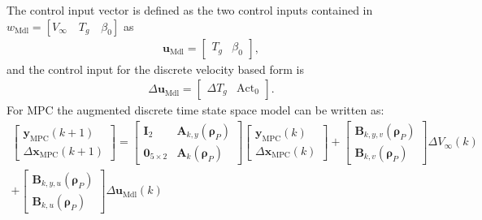 The control input vector is defined as the two control inputs contained in $w_{\text{Mdl}} = [V_{\infty} \quad T_g \quad \beta_0]$ as
\begin{align*}
    \bm{u}_{\text{Mdl}} = \begin{bmatrix} T_g & \beta_0 \end{bmatrix},
\end{align*} 
and the control input for the discrete velocity based form is %
\begin{align} \label{eq:DeltaUinput}
    \Delta \bm{u}_{\text{Mdl}} = \begin{bmatrix} \Delta T_g & \text{Act}_0  \end{bmatrix}. 
\end{align} 
%
For MPC the augmented discrete time state space model can be written as:
\begin{align*}
    \begin{bmatrix}
        \bm{y}_{\text{MPC}}(k+1)  \\
        \Delta \bm{x}_{\text{MPC}}(k+1)
    \end{bmatrix} = \begin{bmatrix}
        \bm{I}_{2} & \bm{A}_{k,y}(\bm{\rho}_P)  \\
        \bm{0}_{5\times2} & \bm{A}_k(\bm{\rho}_P)
    \end{bmatrix}
    \begin{bmatrix}
        \bm{y}_{\text{MPC}}(k) \\
        \Delta \bm{x}_{\text{MPC}}(k)
    \end{bmatrix} 
    + 
    \begin{bmatrix}
        \bm{B}_{k,y,v}(\bm{\rho}_P)  \\  
        \bm{B}_{k,v}(\bm{\rho}_P) 
    \end{bmatrix}\Delta V_{\infty}(k) 
    \\+
    \begin{bmatrix}
        \bm{B}_{k,y,u}(\bm{\rho}_P)     \\
        \bm{B}_{k,u}(\bm{\rho}_P) 
    \end{bmatrix}\Delta \bm{u}_{\text{Mdl}}(k)
\end{align*}
